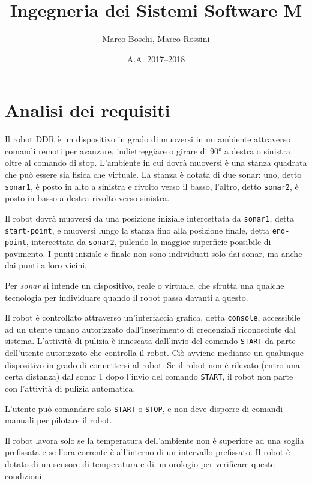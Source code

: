 

\title{Ingegneria dei Sistemi Software M}
\date{A.A. 2017--2018}
\author{Marco Boschi, Marco Rossini}



\maketitletoc

\section{Analisi dei requisiti}
Il robot DDR è un dispositivo in grado di muoversi in un ambiente attraverso comandi remoti per avanzare, indietreggiare o girare di \ang{90} a destra o sinistra oltre al comando di stop. L'ambiente in cui dovrà muoversi è una stanza quadrata che può essere sia fisica che virtuale. La stanza è dotata di due sonar: uno, detto \texttt{sonar1}, è posto in alto a sinistra e rivolto verso il basso, l'altro, detto \texttt{sonar2}, è posto in basso a destra rivolto verso sinistra.

Il robot dovrà muoversi da una posizione iniziale intercettata da \texttt{sonar1}, detta \texttt{start-point}, e muoversi lungo la stanza fino alla posizione finale, detta \texttt{end-point}, intercettata da \texttt{sonar2}, pulendo la maggior superficie possibile di pavimento. I punti iniziale e finale non sono individuati solo dai sonar, ma anche dai punti a loro vicini.

Per \textit{sonar} si intende un dispositivo, reale o virtuale, che sfrutta una qualche tecnologia per individuare quando il robot passa davanti a questo.

Il robot è controllato attraverso un'interfaccia grafica, detta \texttt{console}, accessibile ad un utente umano autorizzato dall'inserimento di credenziali riconosciute dal sistema. L'attività di pulizia è innescata dall'invio del comando \texttt{START} da parte dell'utente autorizzato che controlla il robot. Ciò avviene mediante un qualunque dispositivo in grado di connettersi al robot. Se il robot non è rilevato (entro una certa distanza) dal sonar 1 dopo l'invio del comando \texttt{START}, il robot non parte con l'attività di pulizia automatica. 

L'utente può comandare solo \texttt{START} o \texttt{STOP}, e non deve disporre di comandi manuali per pilotare il robot.

Il robot lavora solo se la temperatura dell'ambiente non è superiore ad una soglia prefissata e se l'ora corrente è all'interno di un intervallo prefissato. Il robot è dotato di un sensore di temperatura e di un orologio per verificare queste condizioni.

